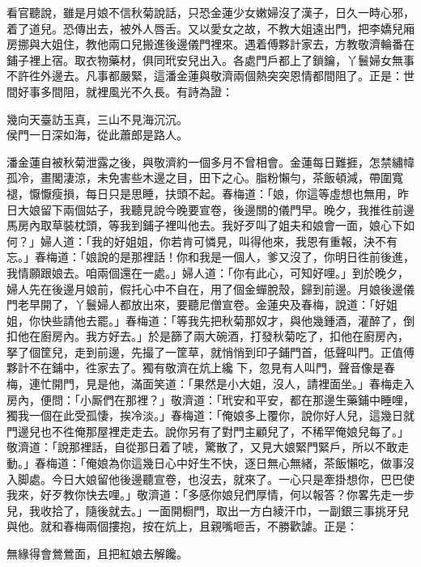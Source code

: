 看官聽說，雖是月娘不信秋菊說話，只恐金蓮少女嫩婦沒了漢子，日久一時心邪，着了道兒。恐傳出去，被外人唇舌。又以愛女之故，不教大姐遠出門，把李嬌兒廂房挪與大姐住，教他兩口兒搬進後邊儀門裡來。遇着傅夥計家去，方教敬濟輪番在鋪子裡上宿。取衣物藥材，俱同玳安兒出入。各處門戶都上了鎖鑰，丫鬟婦女無事不許徃外邊去。凡事都嚴緊，這潘金蓮與敬濟兩個熱突突恩情都間阻了。正是：世間好事多間阻，就裡風光不久長。有詩為證：

\begin{myquote}
幾向天臺訪玉真，三山不見海沉沉。\\侯門一日深如海，從此蕭郎是路人。
\end{myquote}

潘金蓮自被秋菊泄露之後，與敬濟約一個多月不曾相會。金蓮每日難捱，怎禁繡幃孤冷，畫閣淒涼，未免害些木邊之目，田下之心。脂粉懶勻，茶飯頓減，帶圍寬褪，懨懨瘦損，每日只是思睡，扶頭不起。春梅道：「娘，你這等虛想也無用，昨日大娘留下兩個姑子，我聽見說今晚要宣卷，後邊關的儀門早。晚夕，我推徃前邊馬房內取草裝枕頭，等我到鋪子裡叫他去。我好歹叫了姐夫和娘會一面，娘心下如何？」婦人道：「我的好姐姐，你若肯可憐見，叫得他來，我恩有重報，決不有忘。」{}春梅道：「娘說的是那裡話！你和我是一個人，爹又沒了，你明日徃前後進，我情願跟娘去。咱兩個還在一處。」婦人道：「你有此心，可知好哩。」到於晚夕，婦人先在後邊月娘前，假托心中不自在，用了個金蟬脫殼，歸到前邊。月娘後邊儀門老早開了，丫鬟婦人都放出來，要聽尼僧宣卷。金蓮央及春梅，說道：「好姐姐，你快些請他去罷。」春梅道：「等我先把秋菊那奴才，與他幾鍾酒，灌醉了，倒扣他在廚房內。我方好去。」於是篩了兩大碗酒，打發秋菊吃了，扣他在廚房內，拏了個筐兒，走到前邊，先撮了一筐草，就悄悄到印子鋪門首，低聲叫門。正值傅夥計不在鋪中，徃家去了。獨有敬濟在炕上纔𢱉下，忽見有人叫門，聲音像是春梅，連忙開門，見是他，滿面笑道：「果然是小大姐，沒人，請裡面坐。」春梅走入房內，便問：「小厮們在那裡？」{}敬濟道：「玳安和平安，都在那邊生藥鋪中睡哩，獨我一個在此受孤悽，挨冷淡。」春梅道：「俺娘多上覆你，說你好人兒，這幾日就門邊兒也不徃俺那屋裡走走去。說你另有了對門主顧兒了，不稀罕俺娘兒每了。」敬濟道：「說那裡話，自從那日着了唬，驚散了，又見大娘緊門緊戶，所以不敢走動。」春梅道：「俺娘為你這幾日心中好生不快，逐日無心無緒，茶飯懶吃，做事沒入脚處。今日大娘留他後邊聽宣卷，也沒去，就來了。一心只是牽掛想你，巴巴使我來，好歹教你快去哩。」敬濟道：「多感你娘兒們厚情，何以報答？你畧先走一步兒，我收拾了，隨後就去。」一面開橱門，取出一方白綾汗巾，一副銀三事挑牙兒與他。就和春梅兩個摟抱，按在炕上，且親嘴咂舌，不勝歡謔。正是：

\begin{myquote}
無緣得會鶯鶯面，且把紅娘去解饞。
\end{myquote}

